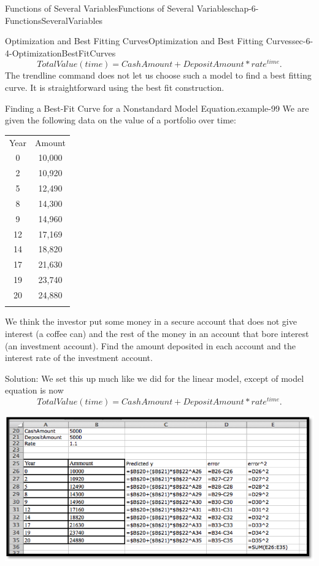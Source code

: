 \documentclass[oneside,10pt,]{book}
\numberwithin{equation}{section}
\newcommand{\hrulethin}  {\noalign{\hrule height 0.04em}}
\newcommand{\hrulethick} {\noalign{\hrule height 0.11em}}
\begin{document}
\begin{chapterptx}{Functions of Several Variables}{}{Functions of Several Variables}{}{}{chap-6-FunctionsSeveralVariables}
\begin{sectionptx}{Optimization and Best Fitting Curves}{}{Optimization and Best Fitting Curves}{}{}{sec-6-4-OptimizationBestFitCurves}
%
\begin{equation*}
TotalValue(time)=CashAmount+DepositAmount*rate^{time}.
\end{equation*}
\hypertarget{p-2460}{}%
The trendline command does not let us choose such a model to find a best fitting curve.  It is straightforward using the best fit construction.%
\begin{example}{Finding a Best-Fit Curve for a Nonstandard Model Equation.}{example-99}%
\hypertarget{p-2461}{}%
We are given the following data on the value of a portfolio over time:%
\begin{sidebyside}{1}{0}{0}{0}%
\begin{sbspanel}{1}%
{\centering%
\begin{tabular}{cc}\hrulethick
Year&Amount\tabularnewline\hrulethin
0&\textdollar{}10,000\tabularnewline\hrulethin
2&\textdollar{}10,920\tabularnewline\hrulethin
5&\textdollar{}12,490\tabularnewline\hrulethin
8&\textdollar{}14,300\tabularnewline\hrulethin
9&\textdollar{}14,960\tabularnewline\hrulethin
12&\textdollar{}17,169\tabularnewline\hrulethin
14&\textdollar{}18,820\tabularnewline\hrulethin
17&\textdollar{}21,630\tabularnewline\hrulethin
19&\textdollar{}23,740\tabularnewline\hrulethin
20&\textdollar{}24,880\tabularnewline\hrulethin
\end{tabular}
\par}
\end{sbspanel}%
\end{sidebyside}%
\par
\hypertarget{p-2462}{}%
We think the investor put some money in a secure account that does not give interest (a coffee can) and the rest of the money in an account that bore interest (an investment account).  Find the amount deposited in each account and the interest rate of the investment account.%
\par
\hypertarget{p-2463}{}%
Solution:  We set this up much like we did for the linear model, except of model equation is now%
%
\begin{equation*}
TotalValue(time)=CashAmount+DepositAmount*rate^{time}.
\end{equation*}
\begin{sidebyside}{1}{0.1}{0.1}{0}%
\begin{sbspanel}{0.8}%
\includegraphics[width=1\linewidth]{images/sec-6-4-6.png}

\end{sbspanel}
\end{sidebyside}
\end{example}
\end{sectionptx}
\end{chapterptx}
\end{document}
